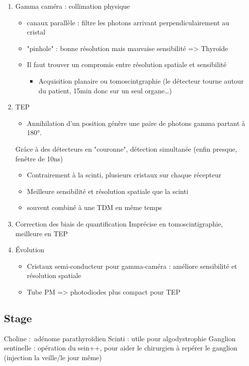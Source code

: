 \documentclass[11pt]{article}
\begin{document}
\begin{enumerate}
\item Gamma caméra : collimation physique
\label{sec:orgbfc7293}
\begin{itemize}
\item canaux parallèle : filtre les photons arrivant perpendiculairement au cristal
\item "pinhole" : bonne résolution mais mauvaise sensibilité => Thyroïde
\item Il faut trouver un compromis entre résolution spatiale et sensibilité
\begin{itemize}
\item Acquisition planaire ou tomoscintgraphie (le détecteur tourne autour du
patient, 15min donc sur un seul organe\ldots{})
\end{itemize}
\end{itemize}
\item TEP
\label{sec:orgf41fbc8}
\begin{itemize}
\item Annihilation d'un position génère une paire de photons gamma partant à 180°.
\end{itemize}
Grâce à des détecteurs en "couronne", détection simultanée (enfin presque,
fenêtre de 10ns)
\begin{itemize}
\item Contrairement à la scinti, plusieurs cristaux sur chaque récepteur
\item Meilleure sensibilité et résolution spatiale que la scinti
\item souvent combiné à une TDM en même temps
\end{itemize}
\item Correction des biais de quantification
\label{sec:org29f8190}
Imprécise en tomoscintigraphie, meilleure en TEP
\item Évolution
\label{sec:orgd92ee59}
\begin{itemize}
\item Cristaux semi-conducteur pour gamma-caméra : améliore sensibilité et résolution spatiale
\item Tube PM => photodiodes plus compact pour TEP
\end{itemize}
\end{enumerate}
\subsection{Stage}
\label{sec:org3c87d59}
Choline : adénome parathyroïdien
Scinti : utile pour algodystrophie
Ganglion sentinelle : opération du sein++, pour aider le chirurgien à repérer le
ganglion (injection la veille/le jour même)
\end{document}
